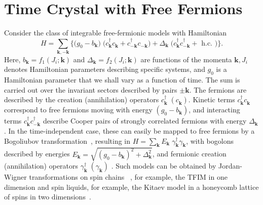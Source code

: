 \documentclass[preprint,5p,times,twocolumn]{elsarticle}
\newcommand{\bmk}{\bm{k}}
\begin{document}
\section{Time Crystal with Free Fermions}
\label{sec:tcfree}
Consider the class of integrable free-fermionic models with Hamiltonian
\begin{equation}
    H  = \sum_{\bmk, -\bmk}\Bigg\{\big(g_0-b_{\bmk}\big)\;\big(c^{\dagger}_{\bmk} c^{\;}_{\bmk}+c^{\dagger}_{-\bmk} c^{\;}_{-\bmk}\big)+\Delta_{\bmk}\;\bigg(c^{\dagger}_{\bmk} c^{\dagger}_{-\bmk}+\text { h.c. }\bigg)\Bigg\}.
    \label{eq:general:hamiltonian}
\end{equation}
Here, $b_{\bmk}=f_{1}\left(J_{i} ; \bmk\right)$ and $\Delta_{\bmk}=f_{2}\left(J_{i} ; \bmk\right)$ are functions of the momenta $\bmk, J_{i}$ denotes Hamiltonian parameters describing specific systems, and $g_{0}$ is a Hamiltonian parameter that we shall vary as a function of time. The sum is carried out over the invariant sectors described by pairs $\pm\bmk$. The fermions are described by the creation (annihilation) operators $c^\dagger_{\bmk}\;\left(c^{\;}_{\bmk}\right)$. Kinetic terms $ c^{\dagger}_{\bmk} c^{\;}_{\bmk}$ correspond to free fermions moving with energy $\left(g_0-b_{\bmk}\right)$, and interacting terms $c^{\dagger}_{\bmk} c^{\dagger}_{-\bmk}$ describe Cooper pairs of strongly correlated fermions with energy $\Delta_{\bmk}$. In the time-independent case, these can easily be mapped to free fermions by a Bogoliubov transformation~\citep{mbeng_quantum_2020}, resulting in $H=\sum_{\bmk}E_{\bmk}\;\gamma^\dagger_{\bmk}\gamma^{\;}_{\bmk}$, with bogolons described by energies $E_{\bmk}=\sqrt{\left(g_0-b_{\bmk}\right)^2 + \Delta^2_{\bmk}}$, and fermionic creation (annihilation) operators $\gamma^\dagger_{\bmk}\;\left(\gamma^{\;}_{\bmk}\right)$ . Such models can be obtained by Jordan-Wigner transformations on spin chains ~\citep{mbeng_quantum_2020}, for example, the TFIM in one dimension and spin liquids, for example, the Kitaev model in a honeycomb lattice of spins in two dimensions~\citep{Chen_2008}. 
\end{document}
